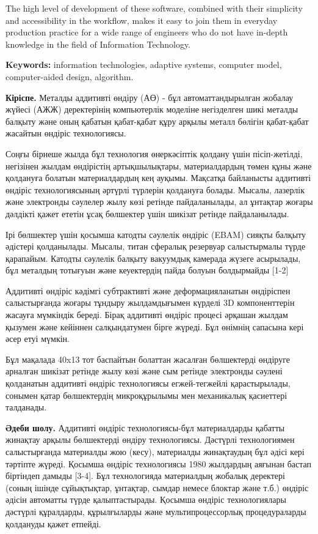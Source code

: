 The high level of development of these software, combined with their
simplicity and accessibility in the workflow, makes it easy to join them
in everyday production practice for a wide range of engineers who do not
have in-depth knowledge in the field of Information Technology.

{\bfseries Keywords:} information technologies, adaptive systems, computer
model, computer-aided design, algorithm.

{\bfseries Кіріспе.} Металды аддитивті өндіру (АӨ) - бұл автоматтандырылған
жобалау жүйесі (АЖЖ) деректерінің компьютерлік моделіне негізделген шикі
металды балқыту және оның қабатын қабат-қабат құру арқылы металл бөлігін
қабат-қабат жасайтын өндіріс технологиясы.

Соңғы бірнеше жылда бұл технология өнеркәсіптік қолдану үшін
пісіп-жетілді, негізінен жылдам өндірістің артықшылықтары,
материалдардың төмен құны және қолдануға болатын материалдардың кең
ауқымы. Мақсатқа байланысты аддитивті өндіріс технологиясының әртүрлі
түрлерін қолдануға болады. Мысалы, лазерлік және электронды сәулелер
жылу көзі ретінде пайдаланылады, ал ұнтақтар жоғары дәлдікті қажет
ететін ұсақ бөлшектер үшін шикізат ретінде пайдаланылады.

Ірі бөлшектер үшін қосымша катодты сәулелік өндіріс (EBAM) сияқты
балқыту әдістері қолданылады. Мысалы, титан сфералық резервуар
салыстырмалы түрде қарапайым. Катодты сәулелік балқыту вакуумдық
камерада жүзеге асырылады, бұл металдың тотығуын және кеуектердің пайда
болуын болдырмайды {[}1-2{]}

Аддитивті өндіріс кәдімгі субтрактивті және деформацияланатын өндіріспен
салыстырғанда жоғары тұндыру жылдамдығымен күрделі 3D компоненттерін
жасауға мүмкіндік береді. Бірақ аддитивті өндіріс процесі әрқашан жылдам
қызумен және кейіннен салқындатумен бірге жүреді. Бұл өнімнің сапасына
кері әсер етуі мүмкін.

Бұл мақалада 40x13 тот баспайтын болаттан жасалған бөлшектерді өндіруге
арналған шикізат ретінде жылу көзі және сым ретінде электронды сәулені
қолданатын аддитивті өндіріс технологиясы егжей-тегжейлі қарастырылады,
сонымен қатар бөлшектердің микроқұрылымы мен механикалық қасиеттері
талданады.

{\bfseries Әдеби шолу.} Аддитивті өндіріс технологиясы-бұл материалдарды
қабатты жинақтау арқылы бөлшектерді өндіру технологиясы. Дәстүрлі
технологиямен салыстырғанда материалды жою (кесу), материалды
жинақтаудың бұл әдісі кері тәртіпте жүреді. Қосымша өндіріс технологиясы
1980 жылдардың аяғынан бастап біртіндеп дамыды {[}3-4{]}. Бұл
технологияда материалдың жобалық деректері (соның ішінде сұйықтықтар,
ұнтақтар, сымдар немесе блоктар және т.б.) өндіріс әдісін автоматты
түрде қалыптастырады. Қосымша өндіріс технологиялары дәстүрлі
құралдарды, құрылғыларды және мультипроцессорлық процедураларды
қолдануды қажет етпейді.

